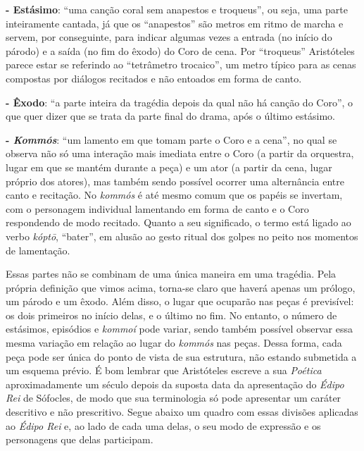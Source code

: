 \textbf{- Estásimo}: ``uma canção coral sem anapestos e troqueus'', ou
seja, uma parte inteiramente cantada, já que os ``anapestos'' são metros
em ritmo de marcha e servem, por conseguinte, para indicar algumas vezes
a entrada (no início do párodo) e a saída (no fim do êxodo) do Coro de
cena. Por ``troqueus'' Aristóteles parece estar se referindo ao
``tetrâmetro trocaico'', um metro típico para as cenas compostas por
diálogos recitados e não entoados em forma de canto.

\textbf{- Êxodo}: ``a parte inteira da tragédia depois da qual não há
canção do Coro'', o que quer dizer que se trata da parte final do drama,
após o último estásimo.

\textbf{- \emph{Kommós}}: ``um lamento em que tomam parte o Coro e a
cena'', no qual se observa não só uma interação mais imediata entre o
Coro (a partir da orquestra, lugar em que se mantém durante a peça) e um
ator (a partir da cena, lugar próprio dos atores), mas também sendo
possível ocorrer uma alternância entre canto e recitação. No
\emph{kommós} é até mesmo comum que os papéis se invertam, com o
personagem individual lamentando em forma de canto e o Coro respondendo
de modo recitado. Quanto a seu significado, o termo está ligado ao verbo
\emph{kóptō}, ``bater'', em alusão ao gesto ritual dos golpes no peito
nos momentos de lamentação.

Essas partes não se combinam de uma única maneira em uma tragédia. Pela
própria definição que vimos acima, torna-se claro que haverá apenas um
prólogo, um párodo e um êxodo. Além disso, o lugar que ocuparão nas
peças é previsível: os dois primeiros no início delas, e o último no
fim. No entanto, o número de estásimos, episódios e \emph{kommoí} pode
variar, sendo também possível observar essa mesma variação em relação ao
lugar do \emph{kommós} nas peças. Dessa forma, cada peça pode ser única
do ponto de vista de sua estrutura, não estando submetida a um esquema
prévio. É bom lembrar que Aristóteles escreve a sua \emph{Poética}
aproximadamente um século depois da suposta data da apresentação do
\emph{Édipo Rei} de Sófocles, de modo que sua terminologia só pode
apresentar um caráter descritivo e não prescritivo. Segue abaixo um
quadro com essas divisões aplicadas ao \emph{Édipo Rei} e, ao lado de
cada uma delas, o seu modo de expressão e os personagens que delas
participam.

